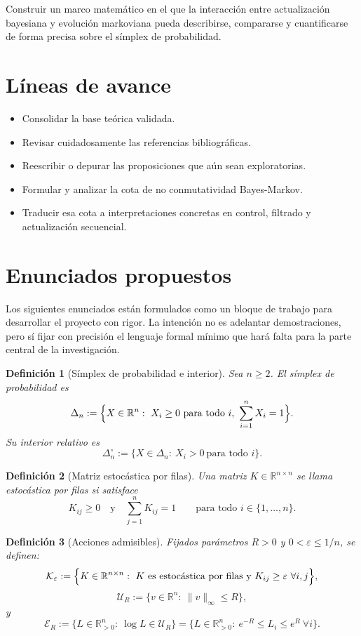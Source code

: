\documentclass[12pt]{article}
\newtheorem{definicion}{Definición}[section]
\begin{document}
Construir un marco matemático en el que la interacción entre actualización
bayesiana y evolución markoviana pueda describirse, compararse y cuantificarse
de forma precisa sobre el símplex de probabilidad.

\section*{Líneas de avance}

\begin{itemize}[nosep]
  \item Consolidar la base teórica validada.
  \item Revisar cuidadosamente las referencias bibliográficas.
  \item Reescribir o depurar las proposiciones que aún sean exploratorias.
  \item Formular y analizar la cota de no conmutatividad Bayes-Markov.
  \item Traducir esa cota a interpretaciones concretas en control, filtrado y
        actualización secuencial.
\end{itemize}

\section*{Enunciados propuestos}

Los siguientes enunciados están formulados como un bloque de trabajo para
desarrollar el proyecto con rigor. La intención no es adelantar demostraciones,
pero sí fijar con precisión el lenguaje formal mínimo que hará falta para la
parte central de la investigación.

\begin{definicion}[Símplex de probabilidad e interior]
Sea $n\geq 2$. El \emph{símplex de probabilidad} es
\[
\Delta_n:=\Bigl\{X\in\mathbb{R}^n:\ X_i\geq 0\ \text{para todo } i,\ 
\sum_{i=1}^n X_i=1\Bigr\}.
\]
Su interior relativo es
\[
\Delta_n^\circ:=\{X\in\Delta_n:\ X_i>0\ \text{para todo } i\}.
\]
\end{definicion}

\begin{definicion}[Matriz estocástica por filas]
Una matriz $K\in\mathbb{R}^{n\times n}$ se llama \emph{estocástica por filas}
si satisface
\[
K_{ij}\geq 0
\quad\text{y}\quad
\sum_{j=1}^n K_{ij}=1
\qquad\text{para todo } i\in\{1,\dots,n\}.
\]
\end{definicion}

\begin{definicion}[Acciones admisibles]
Fijados parámetros $R>0$ y $0<\varepsilon\leq 1/n$, se definen:
\[
\mathcal{K}_\varepsilon
:=
\Bigl\{K\in\mathbb{R}^{n\times n}:\ K \text{ es estocástica por filas y } K_{ij}\geq \varepsilon\ \forall i,j\Bigr\},
\]
\[
\mathcal{U}_R
:=
\bigl\{v\in\mathbb{R}^n:\ \|v\|_\infty\leq R\bigr\},
\]
y
\[
\mathcal{E}_R
:=
\bigl\{L\in\mathbb{R}_{>0}^n:\ \log L\in\mathcal{U}_R\bigr\}
=
\bigl\{L\in\mathbb{R}_{>0}^n:\ e^{-R}\leq L_i\leq e^{R}\ \forall i\bigr\}.
\]
\end{definicion}
\end{document}
